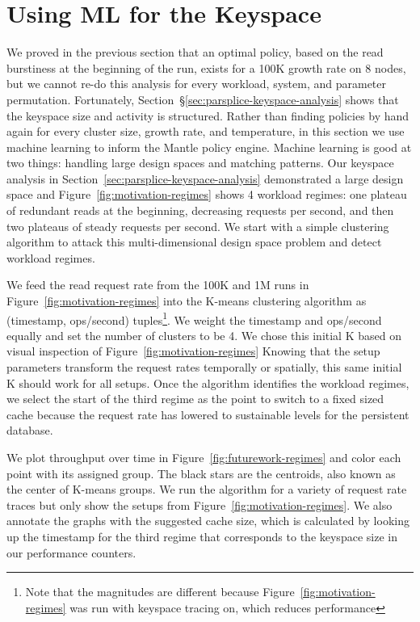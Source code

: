 \section{Using ML for the Keyspace}
\label{sec:ml-for-the-keyspace}

We proved in the previous section that an optimal policy, based on the read
burstiness at the beginning of the run,  exists for a 100K growth rate on 8
nodes, but we cannot re-do this analysis for every workload, system, and
parameter permutation.  Fortunately,
Section~\S\ref{sec:parsplice-keyspace-analysis} shows that the keyspace size
and activity is structured. Rather than finding policies by hand again for
every cluster size, growth rate, and temperature, in this section we use
machine learning to inform the Mantle policy engine.  Machine learning is good
at two things: handling large design spaces and matching patterns. Our keyspace
analysis in Section~\ref{sec:parsplice-keyspace-analysis} demonstrated a large
design space and Figure~\ref{fig:motivation-regimes} shows 4 workload regimes:
one plateau of redundant reads at the beginning, decreasing requests per
second, and then two plateaus of steady requests per second. We start with a
simple clustering algorithm to attack this multi-dimensional design space
problem and detect workload regimes.

We feed the read request rate from the 100K and 1M runs in
Figure~\ref{fig:motivation-regimes} into the K-means clustering algorithm as
(timestamp, ops/second) tuples\footnote{Note that the magnitudes are different
because Figure~\ref{fig:motivation-regimes} was run with keyspace tracing on,
which reduces performance}. We weight the timestamp and ops/second equally and
set the number of clusters to be 4.  We chose this initial K  based on visual
inspection of Figure~\ref{fig:motivation-regimes} Knowing that the setup
parameters transform the request rates temporally or spatially, this same
initial K should work for all setups. Once the algorithm identifies the
workload regimes, we select the start of the third regime as the point to
switch to a fixed sized cache because the request rate has lowered to
sustainable levels for the persistent database.

We plot throughput over time in Figure~\ref{fig:futurework-regimes} and
color each point with its assigned group. The black stars are the centroids,
also known as the center of K-means groups.  We run the algorithm for a variety
of request rate traces but only show the setups from
Figure~\ref{fig:motivation-regimes}. We also annotate the graphs with the
suggested cache size, which is calculated by looking up the timestamp for the
third regime that corresponds to the keyspace size in our performance counters.

